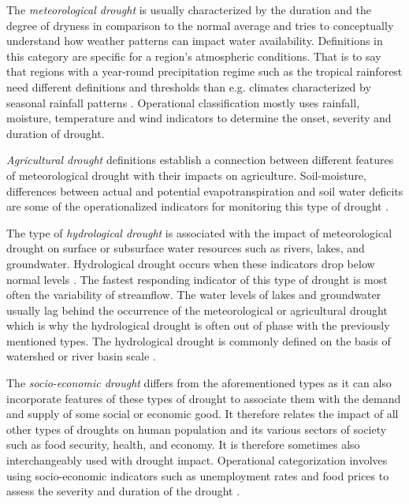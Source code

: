 The \textit{meteorological drought} is usually characterized by the duration and the degree of dryness in comparison to the normal average and tries to conceptually understand how weather patterns can impact water availability. Definitions in this category are specific for a region's atmospheric conditions. That is to say that regions with a year-round precipitation regime such as the tropical rainforest need different definitions and thresholds than e.g. climates characterized by seasonal rainfall patterns \autocite{ndmcTypesDrought2023}. Operational classification mostly uses rainfall, moisture, temperature and wind indicators to determine the onset, severity and duration of drought.

\textit{Agricultural drought} definitions establish a connection between different features of meteorological drought with their impacts on agriculture. Soil-moisture, differences between actual and potential evapotranspiration and soil water deficits are some of the operationalized indicators for monitoring this type of drought \autocite{baltiReviewDroughtMonitoring2020,ndmcTypesDrought2023}.

The type of \textit{hydrological drought} is associated with the impact of meteorological drought on surface or subsurface water resources such as rivers, lakes, and groundwater. Hydrological drought occurs when these indicators drop below normal levels \autocite{palmerMeteorologicalDrought1965}. The fastest responding indicator of this type of drought is most often the variability of streamflow. The water levels of lakes and groundwater usually lag behind the occurrence of the meteorological or agricultural drought which is why the hydrological drought is often out of phase with the previously mentioned types. The hydrological drought is commonly defined on the basis of watershed or river basin scale \autocite{baltiReviewDroughtMonitoring2020,ndmcTypesDrought2023,wilhiteUnderstandingDroughtPhenomenon1985}.

The \textit{socio-economic drought} differs from the aforementioned types as it can also incorporate features of these types of drought to associate them with the demand and supply of some social or economic good. It therefore relates the impact of all other types of droughts on human population and its various sectors of society such as food security, health, and economy. It is therefore sometimes also interchangeably used with drought impact. Operational categorization involves using socio-economic indicators such as unemployment rates and food prices to assess the severity and duration of the drought \autocite{ndmcTypesDrought2023,wilhiteUnderstandingDroughtPhenomenon1985}.

